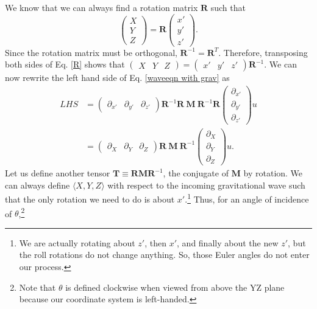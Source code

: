 \documentclass{article}
\begin{document}
We know that we can always find a rotation matrix $\textbf{R}$ such that
\begin{equation} \label{R}
\begin{pmatrix}
X \\
Y \\
Z
\end{pmatrix}=\textbf{R}\begin{pmatrix}
x\prime \\
y\prime \\
z\prime
\end{pmatrix}.
\end{equation} Since the rotation matrix must be orthogonal, $\textbf{R}^{-1}=\textbf{R}^T$. Therefore, transposing both sides of Eq. \ref{R} shows that $\begin{pmatrix} X & Y & Z\end{pmatrix} = \begin{pmatrix}x\prime & y\prime & z\prime\end{pmatrix}\textbf{R}^{-1}.$ We can now rewrite the left hand side of Eq. \ref{waveeqn with grav} as
\begin{align}
LHS &= \begin{pmatrix}\partial_{x\prime} & \partial_{y\prime} & \partial_{z\prime}\end{pmatrix} 
\textbf{R}^{-1}\textbf{R} \  \textbf{M} \ \textbf{R}^{-1}\textbf{R}
\begin{pmatrix} \partial_{x\prime} \\ \partial_{y\prime} \\ \partial_{z\prime} \end{pmatrix}
u \nonumber \\
&= \begin{pmatrix}\partial_X & \partial_Y & \partial_Z\end{pmatrix}
\textbf{R} \  \textbf{M} \ \textbf{R}^{-1}
\begin{pmatrix} \partial_X \\ \partial_Y \\ \partial_Z \end{pmatrix}
u. \label{LHS}
\end{align}
Let us define another tensor $\textbf{T}\equiv\textbf{RMR}^{-1}$, the conjugate of $\textbf{M}$ by rotation. We can always define $\langle X,Y,Z\rangle$ with respect to the incoming gravitational wave such that the only rotation we need to do is about $x\prime$.\footnote{We are actually rotating about $z\prime$, then $x\prime$, and finally about the new $z\prime$, but the roll rotations do not change anything. So, those Euler angles do not enter our process.} Thus, for an angle of incidence of $\theta$,\footnote{Note that $\theta$ is defined clockwise when viewed from above the YZ plane because our coordinate system is left-handed.}
\end{document}
